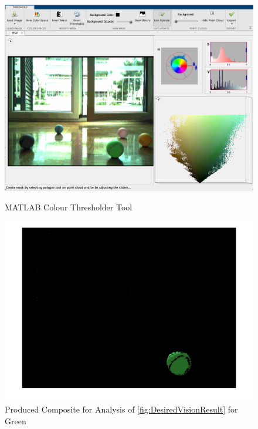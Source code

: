 \documentclass[a4paper]{article}
\begin{document}
\begin{figure}[H]
    \centering
    \begin{minipage}{.5\linewidth}
        \centering
        \includegraphics[scale=0.17]{./images/MatlabColourThresholder}
        \caption{MATLAB Colour Thresholder Tool}
        \label{image:MatlabColourThresholder}
    \end{minipage}\hfill
    \begin{minipage}{.5\linewidth}
        \centering
        \includegraphics[scale=0.18]{./images/GreenThreshold.png}
        \caption{Produced Composite for Analysis of \ref{fig:DesiredVisionResult} for Green }
        \label{image:GreenThreshold}
    \end{minipage}
\end{figure}
\end{document}
